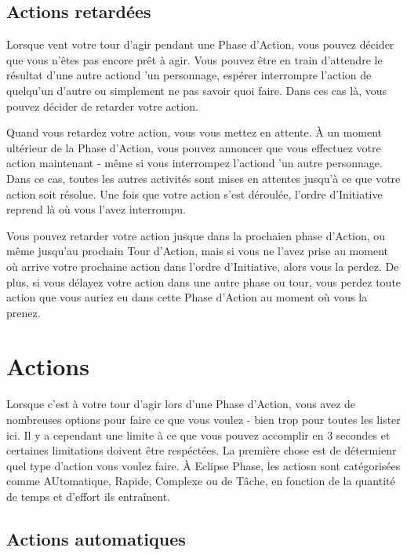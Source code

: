 \subsection{Actions retardées} \label{sec:delayed-actions} 

Lorsque vent votre tour d'agir pendant une Phase d'Action, vous pouvez décider que vous n'êtes pas encore prêt à agir. Vous pouvez être en train d'attendre le résultat d'une autre actiond 'un personnage, espérer interrompre l'action de quelqu'un d'autre ou simplement ne pas savoir quoi faire. Dans ces cas là, vous pouvez décider de retarder votre action. 

Quand vous retardez votre action, vous vous mettez en attente. À un moment ultérieur de la Phase d'Action, vous pouvez annoncer que vous effectuez votre action maintenant - même si vous interrompez l'actiond 'un autre personnage. Dans ce cas, toutes les autres activités sont mises en attentes jusqu'à ce que votre action soit résolue. Une fois que votre action s'est déroulée, l'ordre d'Initiative reprend là où vous l'avez interrompu. 

Vous pouvez retarder votre action jusque dans la prochaien phase d'Action, ou même jusqu'au prochain Tour d'Action, mais si vous ne l'avez prise au moment où arrive votre prochaine action dans l'ordre d'Initiative, alors vous la perdez. De plus, si vous délayez votre action dans une autre phase ou tour, vous perdez toute action que vous auriez eu dans cette Phase d'Action au moment où vous la prenez. 



\section{Actions} \label{sec:actions} 

Lorsque c'est à votre tour d'agir lors d'une Phase d'Action, vous avez de nombreuses options pour faire ce que vous voulez - bien trop pour toutes les lister ici. Il y a cependant une limite à ce que vous pouvez accomplir en 3 secondes et certaines limitations doivent être respéctées. La première chose est de détermienr quel type d'action vous voulez faire. À Eclipse Phase, les actiosn sont catégorisées comme AUtomatique, Rapide, Complexe ou de Tâche, en fonction de la quantité de temps et d'effort ils entraînent. 



\subsection{Actions automatiques} \label{sec:combat-automatic-actions} 

